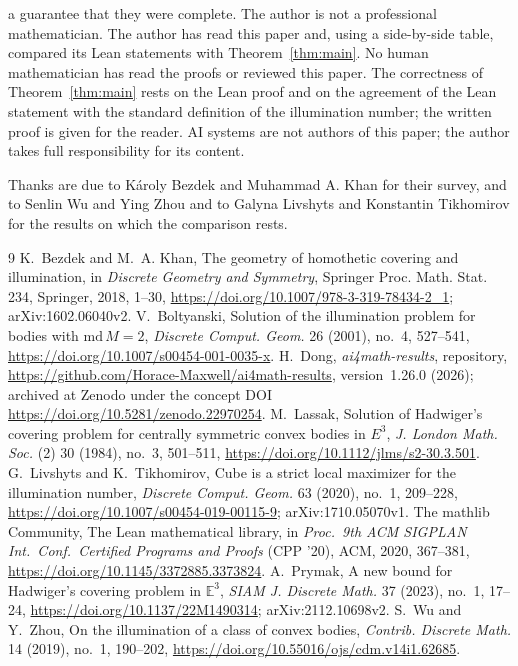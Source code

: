 \documentclass[11pt]{article}
\theoremstyle{definition}
\theoremstyle{remark}
\newcommand{\repoversion}{1.26.0}
\begin{document}
a guarantee that they were complete. The author is not a professional
mathematician. The author has read this paper and, using a side-by-side table, compared its Lean statements with Theorem~\ref{thm:main}. No human mathematician has read the proofs or
reviewed this paper. The correctness of Theorem~\ref{thm:main} rests on the
Lean proof and on the agreement of the Lean statement with the standard
definition of the illumination number; the written proof is given for the
reader. AI systems are not authors of this paper; the author takes full
responsibility for its content.

\medskip
\noindent Thanks are due to K\'aroly Bezdek and Muhammad A. Khan for their
survey, and to Senlin Wu and Ying Zhou and to Galyna Livshyts and Konstantin
Tikhomirov for the results on which the comparison rests.

{\small
\begin{thebibliography}{9}
\setlength{\itemsep}{1pt}
 K.~Bezdek and M.~A. Khan, The geometry of homothetic covering and
illumination, in \emph{Discrete Geometry and Symmetry}, Springer Proc. Math.
Stat. 234, Springer, 2018, 1--30,
\url{https://doi.org/10.1007/978-3-319-78434-2_1}; arXiv:1602.06040v2.
 V.~Boltyanski, Solution of the illumination problem for bodies
with $\mathrm{md}\,M=2$, \emph{Discrete Comput. Geom.} 26 (2001), no.~4,
527--541, \url{https://doi.org/10.1007/s00454-001-0035-x}.
 H.~Dong, \emph{ai4math-results}, repository,
\url{https://github.com/Horace-Maxwell/ai4math-results}, version~\repoversion{}
(2026); archived at Zenodo under the concept DOI
\url{https://doi.org/10.5281/zenodo.22970254}.
 M.~Lassak, Solution of Hadwiger's covering problem for
centrally symmetric convex bodies in $E^3$, \emph{J. London Math. Soc.} (2) 30
(1984), no.~3, 501--511, \url{https://doi.org/10.1112/jlms/s2-30.3.501}.
 G.~Livshyts and K.~Tikhomirov, Cube is a strict local maximizer
for the illumination number, \emph{Discrete Comput. Geom.} 63 (2020), no.~1,
209--228, \url{https://doi.org/10.1007/s00454-019-00115-9};
arXiv:1710.05070v1.
The mathlib Community, The Lean mathematical library, in \emph{Proc.\ 9th ACM
SIGPLAN Int.\ Conf.\ Certified Programs and Proofs} (CPP '20), ACM, 2020,
367--381, \url{https://doi.org/10.1145/3372885.3373824}.
 A.~Prymak, A new bound for Hadwiger's covering problem in
$\mathbb E^3$, \emph{SIAM J. Discrete Math.} 37 (2023), no.~1, 17--24,
\url{https://doi.org/10.1137/22M1490314}; arXiv:2112.10698v2.
 S.~Wu and Y.~Zhou, On the illumination of a class of convex
bodies, \emph{Contrib. Discrete Math.} 14 (2019), no.~1, 190--202,
\url{https://doi.org/10.55016/ojs/cdm.v14i1.62685}.
\end{thebibliography}}
\end{document}
